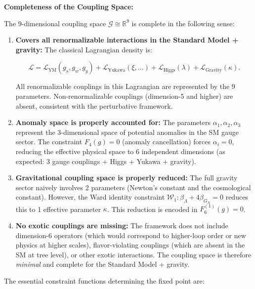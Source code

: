 \begin{lemma}
\textbf{Completeness of the Coupling Space:}

The 9-dimensional coupling space $\mathcal{G} \cong \mathbb{R}^9$ is complete in the following sense:

\begin{enumerate}
\item \textbf{Covers all renormalizable interactions in the Standard Model + gravity:} The classical Lagrangian density is:

\begin{equation}
\mathcal{L} = \mathcal{L}_{\text{YM}}(g_s, g_w, g_y) + \mathcal{L}_{\text{Yukawa}}(\xi, \ldots) + \mathcal{L}_{\text{Higgs}}(\lambda) + \mathcal{L}_{\text{Gravity}}(\kappa).
\end{equation}

All renormalizable couplings in this Lagrangian are represented by the 9 parameters. Non-renormalizable couplings (dimension-5 and higher) are absent, consistent with the perturbative framework.

\item \textbf{Anomaly space is properly accounted for:} The parameters $\alpha_1, \alpha_2, \alpha_3$ represent the 3-dimensional space of potential anomalies in the SM gauge sector. The constraint $F_4(g) = 0$ (anomaly cancellation) forces $\alpha_i = 0$, reducing the effective physical space to 6 independent dimensions (as expected: 3 gauge couplings + Higgs + Yukawa + gravity).

\item \textbf{Gravitational coupling space is properly reduced:} The full gravity sector naively involves 2 parameters (Newton's constant and the cosmological constant). However, the Ward identity constraint $\mathcal{W}_1: \beta_\Lambda + 4\beta_{G_N} = 0$ reduces this to 1 effective parameter $\kappa$. This reduction is encoded in $F_6^{(1)}(g) = 0$.

\item \textbf{No exotic couplings are missing:} The framework does not include dimension-6 operators (which would correspond to higher-loop order or new physics at higher scales), flavor-violating couplings (which are absent in the SM at tree level), or other exotic interactions. The coupling space is therefore \emph{minimal} and complete for the Standard Model + gravity.

\end{enumerate}

The essential constraint functions determining the fixed point are:


\end{lemma}
